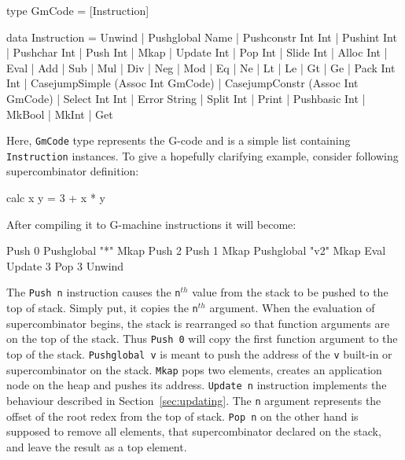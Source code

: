 \documentclass[12pt,a4paper]{report}
\begin{document}
\vspace*{0.2in}
\begin{code}[style=haskell]
type GmCode = [Instruction]

data Instruction = Unwind
                 | Pushglobal Name
                 | Pushconstr Int Int
                 | Pushint Int
                 | Pushchar Int
                 | Push Int
                 | Mkap
                 | Update Int
                 | Pop Int
                 | Slide Int
                 | Alloc Int
                 | Eval
                 | Add | Sub | Mul | Div | Neg | Mod
                 | Eq | Ne | Lt | Le | Gt | Ge
                 | Pack Int Int
                 | CasejumpSimple (Assoc Int GmCode)
                 | CasejumpConstr (Assoc Int GmCode)
                 | Select Int Int
                 | Error String
                 | Split Int
                 | Print
                 | Pushbasic Int
                 | MkBool
                 | MkInt
                 | Get
\end{code}

Here, \texttt{GmCode} type represents the G-code and is a simple list containing
\texttt{Instruction} instances. To give a hopefully clarifying example,
consider following supercombinator definition:

\vspace*{0.2in}
\begin{code}[style=haskell,label=lst:sc_to_compile,caption=Supercombinator to compile.]
calc x y = 3 + x * y
\end{code}

After compiling it to G-machine instructions it will become:

\vspace*{0.2in}
\begin{code}[style=haskell,label=lst:gcode_supercombinator,caption={Compiled
  supercombinator body.}]
Push 0
Pushglobal "*"
Mkap
Push 2
Push 1
Mkap
Pushglobal "v2"
Mkap
Eval
Update 3
Pop 3
Unwind
\end{code}

The \texttt{Push n} instruction causes the \texttt{n}$^{th}$ value from the
stack to be pushed to the top of stack. Simply put, it copies the
\texttt{n}$^{th}$ argument. When the evaluation of supercombinator begins, the
stack is rearranged so that function arguments are on the top of the stack.
Thus \texttt{Push 0} will copy the first function argument to the top of the
stack. \texttt{Pushglobal v} is meant to push the address of the \texttt{v}
built-in or supercombinator on the stack. \texttt{Mkap} pops two elements,
creates an application node on the heap and pushes its address. \texttt{Update
n} instruction implements the behaviour described in
Section~\ref{sec:updating}. The \texttt{n} argument represents the offset of
the root redex from the top of stack. \texttt{Pop n} on the other hand is
supposed to remove all elements, that supercombinator declared on the stack,
and leave the result as a top element.
\end{document}
